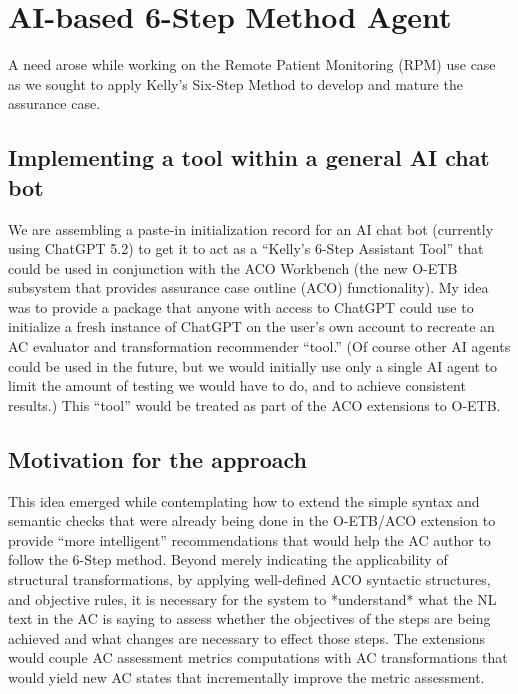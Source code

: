 \documentclass[12pt,twoside,a4paper]{article}
\begin{document}
\section{AI-based 6-Step Method Agent}
A need arose while working on the Remote Patient Monitoring (RPM) use case as we sought to apply Kelly’s Six-Step Method to develop and mature the assurance case.

\subsection{Implementing a tool within a general AI chat bot}
We are assembling a paste-in initialization record for an AI chat bot (currently using ChatGPT 5.2) to get it to act as a “Kelly’s 6-Step Assistant Tool” that could be used in conjunction with the ACO Workbench (the new O-ETB subsystem that provides assurance case outline (ACO) functionality). My idea was to provide a package that anyone with access to ChatGPT could use to initialize a fresh instance of ChatGPT on the user’s own account to recreate an AC evaluator and transformation recommender “tool.”  (Of course other AI agents could be used in the future, but we would initially use only a single AI agent to limit the amount of testing we would have to do, and to achieve consistent results.) This “tool” would be treated as part of the ACO extensions to O-ETB.

\subsection{Motivation for the approach}
This idea emerged while contemplating how to extend the simple syntax and semantic checks that were already being done in the O-ETB/ACO extension to provide “more intelligent” recommendations that would help the AC author to follow the 6-Step method. Beyond merely indicating the applicability of structural transformations, by applying well-defined ACO syntactic structures, and objective rules, it is necessary for the system to *understand* what the NL text in the AC is saying to assess whether the objectives of the steps are being achieved and what changes are necessary to effect those steps. The extensions would couple AC assessment metrics computations with AC transformations that would yield new AC states that incrementally improve the metric assessment.
\end{document}
